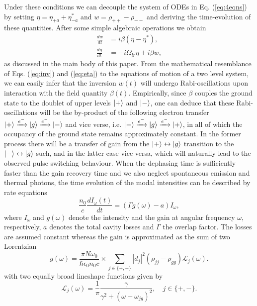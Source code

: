 \documentclass[preprint,secnumarabic,amssymb, nobibnotes, aip, prd]{revtex4-1}
\begin{document}
Under these conditions we can decouple the system of ODEs in Eq. (\ref{eq:4eqns}) by setting $\eta = \eta_{+a}+\eta_{-a}^*$ and $w = \rho_{++}-\rho_{--}$ and deriving the time-evolution of these quantities. After some simple algebraic operations we obtain
\begin{align}
\frac{d w}{dt} &= i\beta(\eta-\eta^*), \label{eq:inv} \\
\frac{d \eta}{dt} &= -i\Omega_{lr}\eta+i\beta w, \label{eq:eta}
\end{align}
as discussed in the main body of this paper. From the mathematical resemblance of Eqs. (\ref{eq:inv}) and (\ref{eq:eta})  to the equations of motion of a two level system, we can easily infer that the inversion $w(t)$ will undergo Rabi-oscillations upon interaction with the field quantity $\beta(t)$. Empirically, since $\beta$ couples the ground state to the doublet of upper levels $\ket{+}$ and $\ket{-}$, one can deduce that these Rabi-oscillations will be the by-product of the following electron transfer $\ket{+}\xrightarrow[]{e^-}\ket{g}\xrightarrow[]{e^-}\ket{-}$ and vice verse, i.e. $\ket{-}\xrightarrow[]{e^-}\ket{g}\xrightarrow[]{e^-}\ket{+}$, in all of which the occupancy of the ground state remains approximately constant. In the former process there will be a transfer of gain from the $\ket{+}\leftrightarrow\ket{g}$ transition to the $\ket{-}\leftrightarrow\ket{g}$ such, and in the latter case vice versa, which will naturally lead to the observed pulse switching behaviour. 
When the dephasing time is sufficiently faster than the gain recovery time \cite{jirauschek2010monte} and we also neglect spontaneous emission and thermal photons, the time evolution of the modal intensities can be described by rate equations
\begin{equation}
\label{eq:intensity}
\frac{n_0}{c}\frac{dI_\omega(t)}{dt} = (\Gamma g(\omega)-a)I_\omega,
\end{equation}
where $I_\omega$ and $g(\omega)$ denote the intensity and the gain at angular frequency $\omega$, respectively, $a$ denotes the total cavity losses and $\Gamma$ the overlap factor. The losses are assumed constant whereas the gain is approximated as the sum of two Lorentzian
\begin{equation}
\label{eq:gain}
g(\omega) = \frac{\pi N\omega_0}{\hbar\epsilon_0 n_0 c} \times \sum_{j \in \{+,-\}} |d_j|^2(\rho_{jj}-\rho_{gg})\mathcal{L}_{j}(\omega).
\end{equation}
with two equally broad lineshape functions given by
\begin{equation}
\mathcal{L}_{j}(\omega) = \frac{1}{\pi}\frac{\gamma}{\gamma^2+(\omega-\omega_{jg})^2} , \quad j \in \{+,-\}.
\end{equation}
\end{document}
